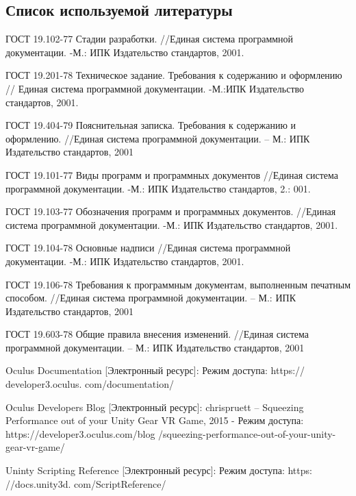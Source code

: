 \subsection{Список используемой литературы}
\begin{my_enumerate}
    \item
    ГОСТ 19.102-77 Стадии разработки. //Единая система программной документации. -М.: ИПК Издательство стандартов, 2001.
    
    \item
    ГОСТ 19.201-78 Техническое задание. Требования к содержанию и оформлению // Единая система программной документации. -М.:ИПК Издательство стандартов, 2001.
    
    \item  ГОСТ 19.404-79 Пояснительная записка. Требования к содержанию и оформлению. //Единая система программной документации. – М.: ИПК Издательство стандартов, 2001
    
    \item
    ГОСТ 19.101-77 Виды программ и программных документов
    //Единая система программной документации. -М.: ИПК Издательство стандартов, 2.: 001.
    
    \item
    ГОСТ 19.103-77 Обозначения программ и программных документов. //Единая система программной документации. -М.: ИПК Издательство стандартов, 2001.
    
    \item
    ГОСТ 19.104-78 Основные надписи //Единая система программной документации. -М.: ИПК Издательство стандартов, 2001.
    
    \item 
    ГОСТ 19.106-78 Требования к программным документам, выполненным печатным способом. //Единая
    система программной документации. – М.: ИПК Издательство стандартов, 2001
    
    \item 
    ГОСТ 19.603-78 Общие правила внесения изменений. //Единая система программной документации. –
    М.: ИПК Издательство стандартов, 2001
    
    \item
    Oculus Documentation [Электронный ресурс]: Режим доступа: https:// developer3.oculus. com/documentation/
    
    \item
    Oculus Developers Blog [Электронный ресурс]: chrispruett – Squeezing Performance out of your Unity Gear VR Game, 2015 - Режим доступа: https://developer3.oculus.com/blog /squeezing-performance-out-of-your-unity-gear-vr-game/
    
    \item 
    Uninty Scripting Reference [Электронный ресурс]: Режим доступа: https: //docs.unity3d. com/ScriptReference/
    
\end{my_enumerate}


